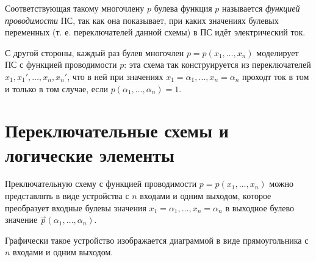 Соответствующая такому многочлену $p$ булева функция $p$ называется \textit{функцией проводимости} ПС, так как она показывает, при каких значениях булевых переменных (т. е. переключателей данной схемы) в ПС идёт электрический ток.

С другой стороны, каждый раз булев многочлен $p=p(x_1,\dots,x_n)$ моделирует ПС с функцией проводимости $p$: эта схема так конструируется из переключателей $x_1, x_1', \dots, x_n, x_n'$, что в ней при значениях $x_1 = \alpha_1, \dots, x_n = \alpha_n$ проходт ток в том и только в том случае, если $p(\alpha_1, \dots, \alpha_n) = 1$.

\section{Переключательные схемы и логические элементы}
Преключательную схему с функцией проводимости $p=p(x_1,\dots,x_n)$ можно представлять в виде устройства с $n$ входами и одним выходом, которое преобразует входные булевы значения $x_1 = \alpha_1, \dots, x_n = \alpha_n$ в выходное булево значение $\vec p(\alpha_1, \dots, \alpha_n)$.

Графически такое устройство изображается диаграммой в виде прямоугольника с $n$ входами и одним выходом.

\begin{figure}[H]
    \centering
    \label{fig:ps4}
    \caption{}
\end{figure}

